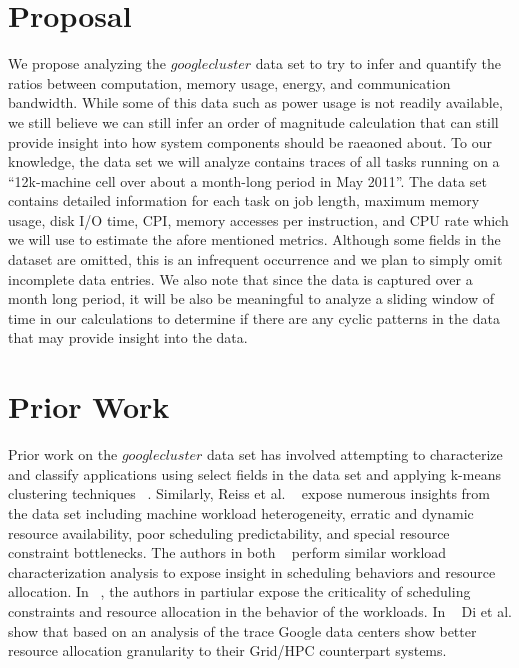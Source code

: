 \documentclass{article}
\begin{document}

\section{Proposal}

We propose analyzing the $googlecluster$ data set to try to infer and quantify the ratios between computation, memory usage, energy, and communication bandwidth. 
While some of this data such as power usage is not readily available, we still believe we can still infer an order of magnitude calculation that can still provide insight into how system components should be raeaoned about.
To our knowledge, the data set we will analyze contains traces of all tasks running on a ``12k-machine cell over about a month-long period in May 2011''.
The data set contains detailed information for each task on job length, maximum memory usage, disk I/O time, CPI, memory accesses per instruction, and CPU rate which we will use to estimate the afore mentioned metrics.
Although some fields in the dataset are omitted, this is an infrequent occurrence and we plan to simply omit incomplete data entries.
We also note that since the data is captured over a month long period, it will be also be meaningful to analyze a sliding window of time in our calculations to determine if there are any cyclic patterns in the data that may provide insight into the data.


\section{Prior Work}

Prior work on the $googlecluster$ data set has involved attempting to characterize and classify applications using select fields in the data set and applying k-means clustering techniques ~\cite{clusterdata:Di2013, clusterdata:Mishra2010}.
Similarly, Reiss et al. ~\cite{clusterdata:Reiss2012b} expose numerous insights from the data set including machine workload heterogeneity, erratic and dynamic resource availability, poor scheduling predictability, and special resource constraint bottlenecks.
The authors in both ~\cite{clusterdata:Liu2012, clusterdata:Mishra2010} perform similar workload characterization analysis to expose insight in scheduling behaviors and resource allocation.
In ~\cite{clusterdata:Liu2012}, the authors in partiular expose the criticality of scheduling constraints and resource allocation in the behavior of the workloads.
In ~\cite{clusterdata:Di2012a} Di et al. show that based on an analysis of the trace Google data centers show better resource allocation granularity to their Grid/HPC counterpart systems.
\end{document}
